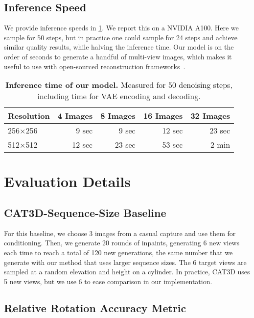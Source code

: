 \subsection{Inference Speed}

We provide inference speeds in \cref{tab:inference_speeds}.
We report this on a NVIDIA A100.
Here we sample for 50 steps, but in practice one could sample for 24 steps and achieve similar quality results, while halving the inference time. Our model is on the order of seconds to generate a handful of multi-view images, which makes it useful to use with open-sourced reconstruction frameworks~\cite{tancik2023nerfstudio}.

\begin{table}[H]
\caption{\label{tab:inference_speeds}%
    \textbf{Inference time of our model.} 
    Measured for 50 denoising steps, including time for VAE encoding and decoding.
}
\centering
\small
\begin{tabular}{lrrrr}
\toprule
Resolution              & 4 Images & 8 Images & 16 Images & 32 Images \\ \midrule
256$\times$256          & 9 sec & 9 sec & 12 sec & 23 sec \\
512$\times$512          & 12 sec & 23 sec & 53 sec & 2 min \\
\bottomrule
\end{tabular}
\vspace{-1em}
\end{table}

\section{Evaluation Details}

\subsection{CAT3D-Sequence-Size Baseline}

For this baseline, we choose 3 images from a casual capture and use them for conditioning.
Then, we generate 20 rounds of inpaints, generating 6 new views each time to reach a total of 120 new generations, the same number that we generate with our method that uses larger sequence sizes.
The 6 target views are sampled at a random elevation and height on a cylinder.
In practice, CAT3D \cite{gao2024cat3d} uses 5 new views, but we use 6 to ease comparison in our implementation.

\subsection{Relative Rotation Accuracy Metric}

